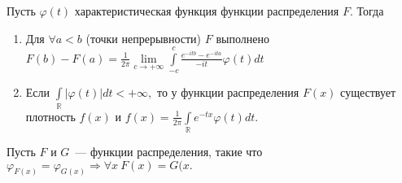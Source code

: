 	\begin{theorem}
		Пусть $\varphi(t)$ характеристическая функция функции распределения $F$. Тогда
		\begin{enumerate}
			\item Для $\forall a < b$ (точки непрерывности) $F$ выполнено
			$F(b) - F(a) = \frac{1}{2\pi} \lim\limits_{c \to +\infty} \int\limits_{-c}^{c} \frac{e^{-itb} - e^{-ita}}{-it}\varphi(t)dt$
			\item Если $\int\limits_\mathbb{R}|\varphi(t)|dt < +\infty,$ то у функции распределения $F(x)$ существует плотность $f(x)$ и $f(x) = \frac{1}{2\pi}\int\limits_\mathbb{R} e^{-tx}\varphi(t)dt.$
		\end{enumerate}
	\end{theorem}
	
	\begin{theorem}[единственности]
		Пусть \(F\) и \(G\)~--- функции распределения, такие что \(\varphi_{F(x)} = \varphi_{G(x)} \Rightarrow \forall x~F(x) = G(x.\)
	\end{theorem}
